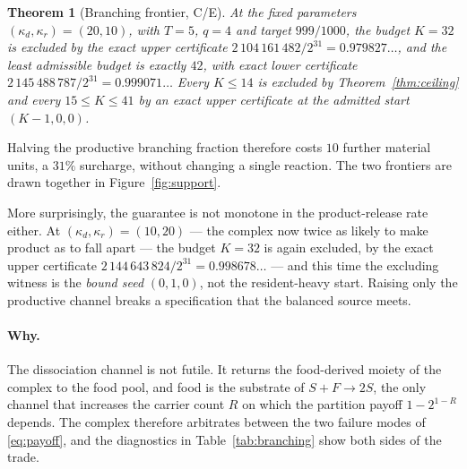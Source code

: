 \documentclass[11pt]{article}
\theoremstyle{plain}
\newtheorem{theorem}{Theorem}[section]
\theoremstyle{definition}
\theoremstyle{remark}
\begin{document}
\begin{theorem}[Branching frontier, C/E]\label{thm:min42}
At the fixed parameters $(\kappa_d,\kappa_r)=(20,10)$, with $T=5$, $q=4$ and
target $999/1000$, the budget $K=32$ is excluded by the exact upper
certificate $2\,104\,161\,482/2^{31}=0.979827\ldots$, and the least admissible
budget is exactly $42$, with exact lower certificate
$2\,145\,488\,787/2^{31}=0.999071\ldots$ Every $K\le14$ is excluded by
Theorem~\ref{thm:ceiling} and every $15\le K\le41$ by an exact upper
certificate at the admitted start $(K-1,0,0)$.
\end{theorem}

Halving the productive branching fraction therefore costs $10$ further
material units, a $31\%$ surcharge, without changing a single reaction. The
two frontiers are drawn together in Figure~\ref{fig:support}.

More surprisingly, the guarantee is not monotone in the product-release rate
either. At $(\kappa_d,\kappa_r)=(10,20)$ --- the complex now twice as likely
to make product as to fall apart --- the budget $K=32$ is again excluded, by
the exact upper certificate $2\,144\,643\,824/2^{31}=0.998678\ldots$ --- and
this time the excluding witness is the \emph{bound seed} $(0,1,0)$, not the
resident-heavy start. Raising only the productive channel breaks a
specification that the balanced source meets.

\paragraph{Why.} The dissociation channel is not futile. It returns the
food-derived moiety of the complex to the food pool, and food is the substrate
of $S+F\to2S$, the only channel that increases the carrier count $R$ on which
the partition payoff $1-2^{1-R}$ depends. The complex therefore arbitrates
between the two failure modes of \eqref{eq:payoff}, and the diagnostics in
Table~\ref{tab:branching} show both sides of the trade.
\end{document}
